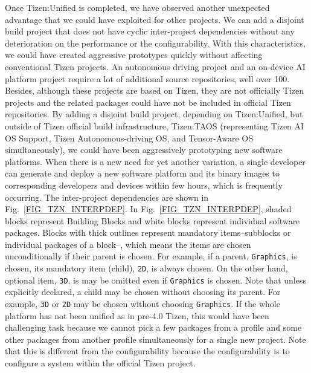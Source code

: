 Once Tizen:Unified is completed, we have observed another unexpected advantage that we could have exploited for other projects.
We can add a disjoint build project that does not have cyclic inter-project dependencies without any deterioration on the performance or the configurability.
With this characteristics, we could have created aggressive prototypes quickly without affecting conventional Tizen projects.
An autonomous driving project and an on-device AI platform project require a lot of additional source repositories, well over 100.
Besides, although these projects are based on Tizen, they are not officially Tizen projects and the related packages could have not be included in official Tizen repositories.
By adding a disjoint build project, depending on Tizen:Unified, but outside of Tizen official build infrastructure, Tizen:TAOS (representing Tizen AI OS Support, Tizen Autonomous-driving OS, and Tensor-Aware OS simultaneously), we could have been aggressively prototyping new software platforms.
When there is a new need for yet another variation, a single developer can generate and deploy a new software platform and its binary images to corresponding developers and devices within few hours, which is frequently occurring.
The inter-project dependencies are shown in Fig.~\ref{FIG_TZN_INTERPDEP}.
In Fig.~\ref{FIG_TZN_INTERPDEP}, shaded blocks represent Building Blocks and white blocks represent individual software packages.
Blocks with thick outlines represent mandatory items--subblocks or individual packages of a block--, which means the items are chosen unconditionally if their parent is chosen.
For example, if a parent, \texttt{Graphics}, is chosen, its mandatory item (child), \texttt{2D}, is always chosen.
On the other hand, optional item, \texttt{3D}, is may be omitted even if \texttt{Graphics} is chosen.
Note that unless explicitly declared, a child may be chosen without choosing its parent.
For example, \texttt{3D} or \texttt{2D} may be chosen without choosing \texttt{Graphics}.
If the whole platform has not been unified as in pre-4.0 Tizen, this would have been challenging task because we cannot pick a few packages from a profile and some other packages from another profile simultaneously for a single new project.
Note that this is different from the configurability because the configurability is to configure a system within the official Tizen project.

